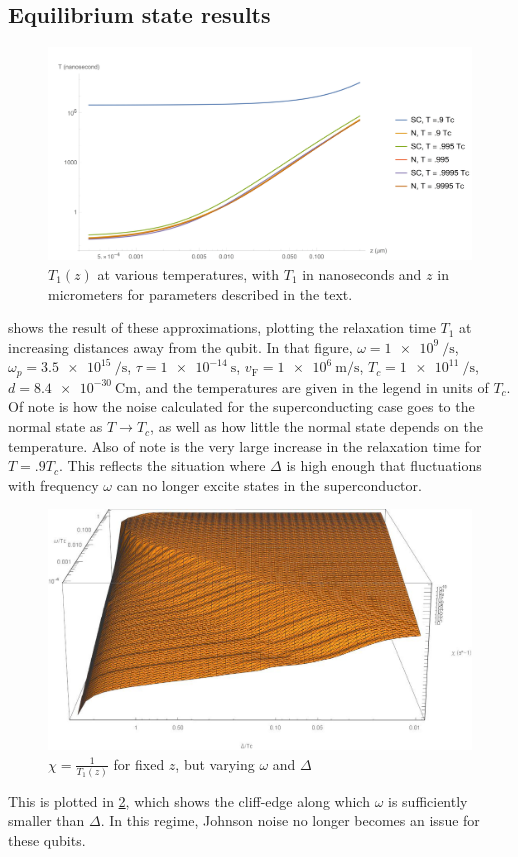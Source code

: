 \documentclass[%
 preprint,
 amsmath,amssymb,
 aps,
]{revtex4-2}
\newcommand{\vf}{v_{\mathrm{F}}}
\begin{document}
\subsection{Equilibrium state results} \label{subsec:equilibrium:results}
\begin{figure}[htp]
	\centering
	\includegraphics[width=\linewidth]{HighTempNam1}
	\caption{$T_1(z)$ at various temperatures, with $T_1$ in nanoseconds and $z$ in micrometers for parameters described in the text.} \label{fig:HighTempNam1}
\end{figure}
 shows the result of these approximations, plotting the relaxation time $T_1$ at increasing distances away from the qubit.
In that figure, $\omega = \SI{1e9}{\per\second}$, $\omega_p = \SI{3.5e15}{\per\second}$, $\tau = \SI{1e-14}{\second}$, $\vf = \SI{1e6}{\m\per\s}$, $T_c = \SI{1e11}{\per\s}$, $d = \SI{8.4e-30}{\coulomb\m}$, and the temperatures are given in the legend in units of $T_c$.
Of note is how the noise calculated for the superconducting case goes to the normal state as $T \rightarrow T_c$, as well as how little the normal state depends on the temperature.
Also of note is the very large increase in the relaxation time for $T = .9 T_c$.
This reflects the situation where $\Delta$ is high enough that fluctuations with frequency $\omega$ can no longer excite states in the superconductor.
\begin{figure}[htp]
	\centering
	\includegraphics[width=\linewidth]{namNoiseCliff}
	\caption{$\chi = \frac{1}{T_1(z)}$ for fixed $z$, but varying $\omega$ and $\Delta$} \label{fig:Cliff}
\end{figure}
This is plotted in \cref{fig:Cliff}, which shows the cliff-edge along which $\omega$ is sufficiently smaller than $\Delta$.
In this regime, Johnson noise no longer becomes an issue for these qubits.
\end{document}
